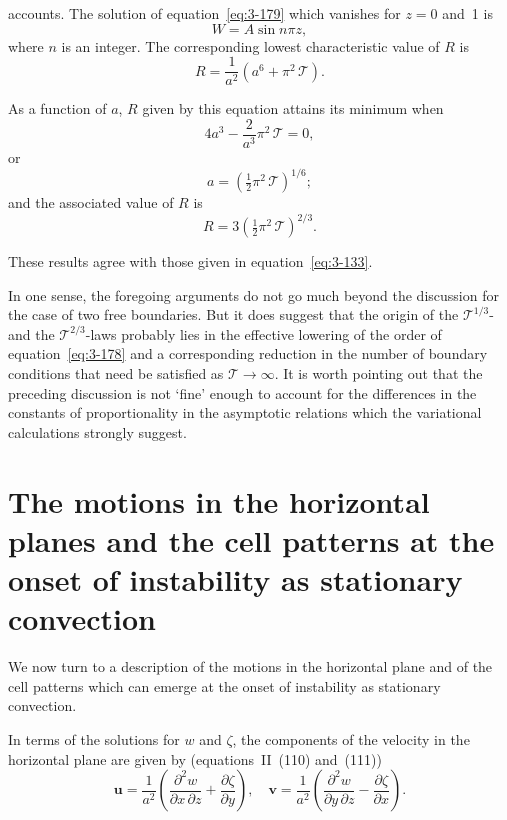 accounts. The solution of equation~\eqref{eq:3-179} which vanishes for $z = 0$ and~1 is
\begin{equation}\label{eq:3-180}
W = A\sin n\pi z,
\end{equation}
where $n$ is an integer. The corresponding lowest characteristic value of $R$ is
\begin{equation}\label{eq:3-181}
R = \frac{1}{a^2}(a^6 + \pi^2\,\mathscr{T}).
\end{equation}

As a function of $a$, $R$ given by this equation attains its minimum when
\begin{equation}\label{eq:3-182}
4a^3 - \frac{2}{a^3}\pi^2\,\mathscr{T} = 0,
\end{equation}
or
\begin{equation}\label{eq:3-183}
a = (\tfrac{1}{2}\pi^2\,\mathscr{T})^{1/6};
\end{equation}
and the associated value of $R$ is
\begin{equation}\label{eq:3-184}
R = 3(\tfrac{1}{2}\pi^2\,\mathscr{T})^{2/3}.
\end{equation}

These results agree with those given in equation~\eqref{eq:3-133}.

In one sense, the foregoing arguments do not go much beyond the discussion for the case of two free boundaries. But it does suggest that the origin of the $\mathscr{T}^{1/3}$- and the $\mathscr{T}^{2/3}$-laws probably lies in the effective lowering of the order of equation~\eqref{eq:3-178} and a corresponding reduction in the number of boundary conditions that need be satisfied as $\mathscr{T}\to\infty$. It is worth pointing out that the preceding discussion is not `fine' enough to account for the differences in the constants of proportionality in the asymptotic relations which the variational calculations strongly suggest.

\section{The motions in the horizontal planes and the cell patterns at the onset of instability as stationary convection}\label{sec:3-28}

We now turn to a description of the motions in the horizontal plane and of the cell patterns which can emerge at the onset of instability as stationary convection.

In terms of the solutions for $w$ and $\zeta$, the components of the velocity in the horizontal plane are given by (equations~II~(110) and~(111))
\begin{equation}\label{eq:3-185}
\mathbf{u} = \frac{1}{a^2}\!\left(\frac{\partial^2 w}{\partial x\,\partial z}+\frac{\partial\zeta}{\partial y}\right), \quad
\mathbf{v} = \frac{1}{a^2}\!\left(\frac{\partial^2 w}{\partial y\,\partial z}-\frac{\partial\zeta}{\partial x}\right).
\end{equation}

